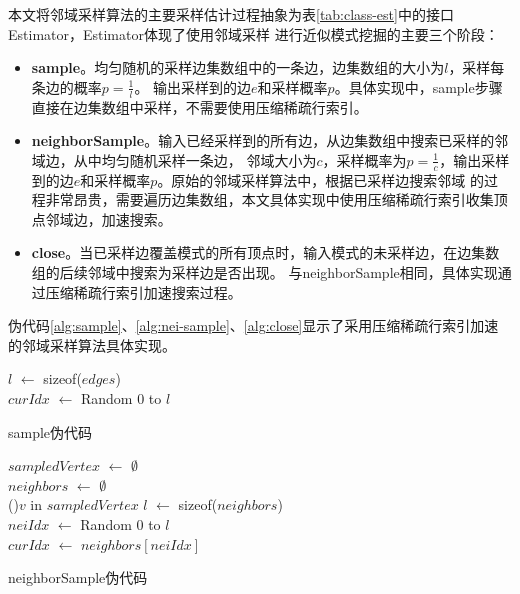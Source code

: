 \documentclass[master]{thesis-uestc}
\begin{document}
    本文将邻域采样算法的主要采样估计过程抽象为表\ref{tab:class-est}中的接口Estimator，Estimator体现了使用邻域采样
进行近似模式挖掘的主要三个阶段：
\begin{itemize}
    \item \textbf{sample}。均匀随机的采样边集数组中的一条边，边集数组的大小为$l$，采样每条边的概率$p=\frac{1}{l}$。
    输出采样到的边$e$和采样概率$p$。具体实现中，sample步骤直接在边集数组中采样，不需要使用压缩稀疏行索引。

    \item \textbf{neighborSample}。输入已经采样到的所有边，从边集数组中搜索已采样的邻域边，从中均匀随机采样一条边，
    邻域大小为$c$，采样概率为$p=\frac{1}{c}$，输出采样到的边$e$和采样概率$p$。原始的邻域采样算法中，根据已采样边搜索邻域
    的过程非常昂贵，需要遍历边集数组，本文具体实现中使用压缩稀疏行索引收集顶点邻域边，加速搜索。

    \item \textbf{close}。当已采样边覆盖模式的所有顶点时，输入模式的未采样边，在边集数组的后续邻域中搜索为采样边是否出现。
    与neighborSample相同，具体实现通过压缩稀疏行索引加速搜索过程。
\end{itemize}

    伪代码\ref{alg:sample}、\ref{alg:nei-sample}、\ref{alg:close}显示了采用压缩稀疏行索引加速的邻域采样算法具体实现。

\begin{algorithm}[H]
    $l$ $\leftarrow$ sizeof($edges$)\\
    $curIdx$ $\leftarrow$ Random 0 to $l$\\
    \caption{sample伪代码}
    \label{alg:sample}
\end{algorithm}

\begin{algorithm}[H]
    $sampledVertex$ $\leftarrow$ $\emptyset$\\
    $neighbors$ $\leftarrow$ $\emptyset$\\
    \For(){$v$ in $sampledVertex$}{
    }
    $l$ $\leftarrow$ sizeof($neighbors$)\\
    $neiIdx$ $\leftarrow$ Random 0 to $l$\\
    $curIdx$ $\leftarrow$ $neighbors[neiIdx]$\\
    \caption{neighborSample伪代码}
    \label{alg:nei-sample}
\end{algorithm}
\end{document}
